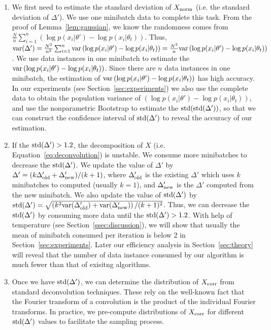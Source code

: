 \documentclass{article}
\begin{document}
\begin{enumerate}[noitemsep]
    \item We first need to estimate the standard deviation of $X_{\rm norm}$ (i.e. the standard deviation of $\Delta'$). We use one minibatch data to complete this task. From the proof of Lemma~\ref{lem:gaussian}, we know the randomness comes from $\frac{N}{n}\sum_{i=1}^n \left(\log p(x_i|\theta') - \log p(x_i|\theta_t) \right)$. Thus, ${\rm var}(\Delta') = \frac{N^2}{n^2}\sum_{i=1}^n{\rm var}\left (  \log p(x_i|\theta') - \log p(x_i|\theta_t) \right ) = \frac{N^2}{n}{\rm var}\left (  \log p(x_i|\theta') - \log p(x_i|\theta_t) \right )$. We use data instances in one minibatch to estimate the ${\rm var} \left (  \log p(x_i|\theta') - \log p(x_i|\theta_t) \right )$. Since there are $n$ data instances in one minibatch, the estimation of ${\rm var} \left (  \log p(x_i|\theta') - \log p(x_i|\theta_t) \right )$ has high accuracy. In our experiments (see Section~\ref{sec:experiments}) we also use the complete data to obtain the population variance of $\left (  \log p(x_i|\theta') - \log p(x_i|\theta_t) \right )$, and use the nonparametric Bootstrap to estimate the ${\rm std(std}(\Delta'))$, so that we can construct the confidence interval of ${\rm std}(\Delta')$ to reveal the accuracy of our estimation.

	\item If the ${\rm std}(\Delta') > 1.2$, the decomposition of $X$ (i.e. Equation~\ref{eq:deconvolution}) is unstable. We consume more minibatches to decrease the ${\rm std}(\Delta')$. We update the value of $\Delta'$ by $\Delta' = (k\Delta'_{\rm old} + \Delta'_{\rm new}) / (k+1)$, where $\Delta'_{\rm old}$ is the existing $\Delta'$ which uses $k$ minibatches to computed (usually $k=1$), and $\Delta'_{\rm new}$ is the $\Delta'$ computed from the new minibatch. We also update the value of ${\rm std}(\Delta')$ by ${\rm std}(\Delta') = \sqrt{\left ( k^2 {\rm var}(\Delta'_{\rm old}) + {\rm var}(\Delta'_{\rm new}) \right ) / (k+1)^2}$. Thus, we can decrease the ${\rm std}(\Delta')$ by consuming more data until the ${\rm std}(\Delta') > 1.2$. With help of temperature (see Section~\ref{ssec:discussion}), we will show that usually the mean of minibatch consumed per iteration is below 2 in Section~\ref{sec:experiments}. Later our efficiency analysis in Section~\ref{sec:theory} will reveal that the number of data instance consumed by our algorithm is much fewer than that of exisitng algorithms.

    \item Once we have ${\rm std}(\Delta')$, we can determine the distribution of $X_{\rm corr}$
    from standard deconvolution techniques. These rely on the well-known fact that the Fourier
    transform of a convolution is the product of the individual Fourier transforms. In practice, we
    pre-compute distributions of $X_{\rm corr}$ for different ${\rm std}(\Delta')$ values to
    facilitate the sampling process.
\end{enumerate}
\end{document}
